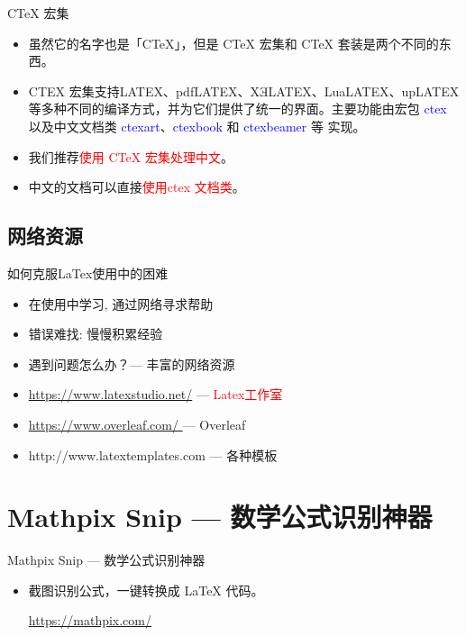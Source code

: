 \documentclass[13pt]{ctexbeamer}
\newcommand{\red}[1]{\textcolor{red}{#1}}
\newcommand{\blue}[1]{\textcolor{blue}{#1}}
\begin{document}
\begin{frame}{CTeX 宏集}
	\begin{itemize}
		\item
		虽然它的名字也是「CTeX」，但是 CTeX 宏集和 CTeX 套装是两个不同的东西。
		\item  CTEX 宏集支持LATEX、pdfLATEX、XƎLATEX、LuaLATEX、upLATEX 等多种不同的编译方式，并为它们提供了统一的界面。主要功能由宏包  \blue{ctex} 以及中文文档类  \blue{ctexart}、\blue{ctexbook} 和  \blue{ctexbeamer}  等 实现。
		\item 我们推荐\red{使用 CTeX 宏集处理中文}。
		\item 中文的文档可以直接\red{使用ctex 文档类}。
	\end{itemize}


\end{frame}



\subsection{网络资源}




\begin{frame}{如何克服LaTex使用中的困难}
	\begin{itemize}
\item 	  在使用中学习, 通过网络寻求帮助

\item 	  错误难找: 慢慢积累经验

\item 	  遇到问题怎么办？---  丰富的网络资源

	\end{itemize}


\begin{itemize}
    \item
   \blue{ \href{https://www.latexstudio.net/}{https://www.latexstudio.net/} }   ---     \red{Latex工作室}
    \item
    \href{https://www.overleaf.com?r=4c8832b9&rm=d&rs=b
}{https://www.overleaf.com/
}   ---  Overleaf
\item
http://www.latextemplates.com --- 各种模板

\end{itemize}
\end{frame}


\section{Mathpix Snip --- 数学公式识别神器}
\begin{frame}{Mathpix Snip --- 数学公式识别神器}
\begin{itemize}
	\item 截图识别公式，一键转换成 LaTeX 代码。

\href{https://mathpix.com/}{https://mathpix.com/}
\end{itemize}
\end{frame}
\end{document}
